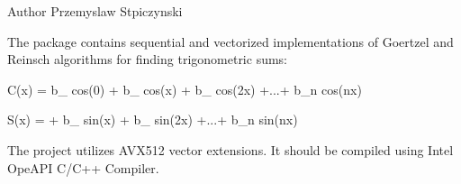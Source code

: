 \begin{DoxyAuthor}{Author}
Przemyslaw Stpiczynski
\end{DoxyAuthor}
The package contains sequential and vectorized implementations of Goertzel and Reinsch algorithms for finding trigonometric sums\+:

C(x) = b\+\_ cos(0) + b\+\_ cos(x) + b\+\_ cos(2x) +...+ b\+\_\+n cos(nx)

S(x) = + b\+\_ sin(x) + b\+\_ sin(2x) +...+ b\+\_\+n sin(nx)

The project utilizes AVX512 vector extensions. It should be compiled using Intel Ope\+API C/\+C++ Compiler. 